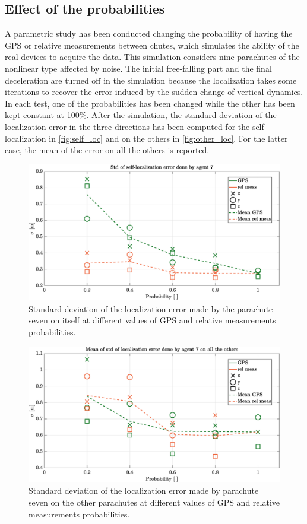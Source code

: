 \subsection{Effect of the probabilities}
A parametric study has been conducted changing the probability of having the GPS or relative measurements between chutes, which simulates the ability of the real devices to acquire the data. This simulation considers nine parachutes of the nonlinear type affected by noise. The initial free-falling part and the final deceleration are turned off in the simulation because the localization takes some iterations to recover the error induced by the sudden change of vertical dynamics. In each test, one of the probabilities has been changed while the other has been kept constant at 100\%. After the simulation, the standard deviation of the localization error in the three directions has been computed for the self-localization in \autoref{fig:self_loc} and on the others in \autoref{fig:other_loc}. For the latter case, the mean of the error on all the others is reported.
\begin{figure}[h]
    \centering
    \includegraphics[width=\columnwidth]{images/mdl2_9chutes_parametric_beforeconsensus.eps}
    \caption{Standard deviation of the localization error made by the parachute seven on itself at different values of GPS and relative measurements probabilities.}
    \label{fig:self_loc}
\end{figure}
\begin{figure}[h]
    \centering
    \includegraphics[width=\columnwidth]{images/mdl2_9chutes_parametric_loc_others.eps}
    \caption{Standard deviation of the localization error made by parachute seven on the other parachutes at different values of GPS and relative measurements probabilities.}
    \label{fig:other_loc}
\end{figure}
